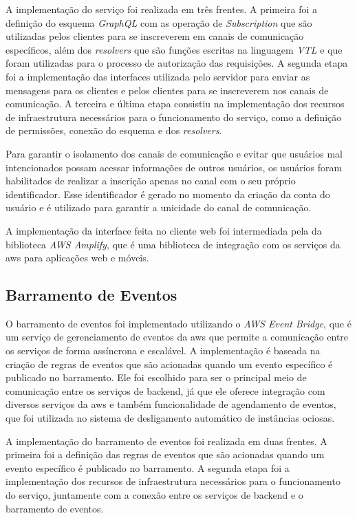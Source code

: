 A implementação do serviço foi realizada em três frentes. A primeira foi a definição do esquema \textit{GraphQL} com as operação de \textit{Subscription} que são utilizadas pelos clientes para se inscreverem em canais de comunicação específicos, além dos \textit{resolvers} que são funções escritas na linguagem \textit{VTL} e que foram utilizadas para o processo de autorização das requisições. A segunda etapa foi a implementação das interfaces utilizada pelo servidor para enviar as mensagens para os clientes e pelos clientes para se inscreverem nos canais de comunicação. A terceira e última etapa consistiu na implementação dos recursos de infraestrutura necessários para o funcionamento do serviço, como a definição de permissões, conexão do esquema e dos \textit{resolvers}.

Para garantir o isolamento dos canais de comunicação e evitar que usuários mal intencionados possam acessar informações de outros usuários, os usuários foram habilitados de realizar a inscrição apenas no canal com o seu próprio identificador. Esse identificador é gerado no momento da criação da conta do usuário e é utilizado para garantir a unicidade do canal de comunicação.

A implementação da interface feita no cliente web foi intermediada pela da biblioteca \textit{AWS Amplify}, que é uma biblioteca de integração com os serviços da \gls{aws} para aplicações web e móveis.

\subsection{Barramento de Eventos}
\label{subsec:barramentoDeEventos}

O barramento de eventos foi implementado utilizando o \textit{AWS Event Bridge}, que é um serviço de gerenciamento de eventos da \gls{aws} que permite a comunicação entre os serviços de forma assíncrona e escalável. A implementação é baseada na criação de regras de eventos que são acionadas quando um evento específico é publicado no barramento. Ele foi escolhido para ser o principal meio de comunicação entre os serviços de backend, já que ele oferece integração com diversos serviços da \gls{aws} e também funcionalidade de agendamento de eventos, que foi utilizada no sistema de desligamento automático de instâncias ociosas.

A implementação do barramento de eventos foi realizada em duas frentes. A primeira foi a definição das regras de eventos que são acionadas quando um evento específico é publicado no barramento. A segunda etapa foi a implementação dos recursos de infraestrutura necessários para o funcionamento do serviço, juntamente com a conexão entre os serviços de backend e o barramento de eventos.

